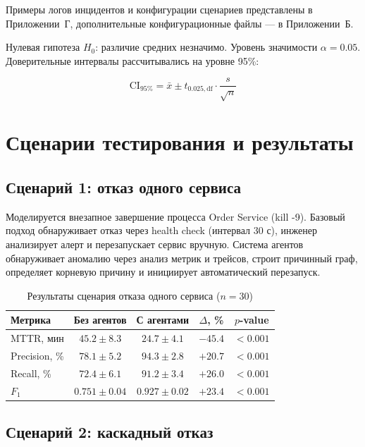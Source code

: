 Примеры логов инцидентов и конфигурации сценариев представлены в Приложении~Г, дополнительные конфигурационные файлы --- в Приложении~Б.

Нулевая гипотеза $H_0$: различие средних незначимо. Уровень значимости $\alpha = 0.05$. Доверительные интервалы рассчитывались на уровне 95\%:

\begin{equation}
\text{CI}_{95\%} = \bar{x} \pm t_{0.025, \text{df}} \cdot \frac{s}{\sqrt{n}}
\label{eq:confidence_interval}
\end{equation}

\section{Сценарии тестирования и результаты}

\subsection{Сценарий 1: отказ одного сервиса}

Моделируется внезапное завершение процесса Order Service (kill -9). Базовый подход обнаруживает отказ через health check (интервал 30 с), инженер анализирует алерт и перезапускает сервис вручную. Система агентов обнаруживает аномалию через анализ метрик и трейсов, строит причинный граф, определяет корневую причину и инициирует автоматический перезапуск.

\begin{table}[H]
\centering
\caption{Результаты сценария отказа одного сервиса ($n = 30$)}
\label{tab:scenario1_results}
\begin{tabular}{|l|c|c|c|c|}
\hline
\textbf{Метрика} & \textbf{Без агентов} & \textbf{С агентами} & \textbf{$\Delta$, \%} & \textbf{$p$-value} \\
\hline
MTTR, мин & $45.2 \pm 8.3$ & $24.7 \pm 4.1$ & $-45.4$ & $< 0.001$ \\
\hline
Precision, \% & $78.1 \pm 5.2$ & $94.3 \pm 2.8$ & $+20.7$ & $< 0.001$ \\
\hline
Recall, \% & $72.4 \pm 6.1$ & $91.2 \pm 3.4$ & $+26.0$ & $< 0.001$ \\
\hline
$F_1$ & $0.751 \pm 0.04$ & $0.927 \pm 0.02$ & $+23.4$ & $< 0.001$ \\
\hline
\end{tabular}
\end{table}

\subsection{Сценарий 2: каскадный отказ}

